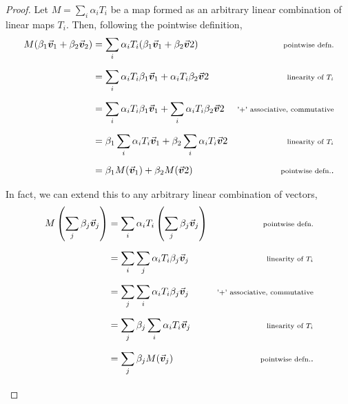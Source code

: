 \documentclass[../MathsNotesBase.tex]{subfiles}
\begin{document}
{		\bigskip
		\begin{proof}
			Let ${ M = \sum_i \alpha_i T_i }$ be a map formed as an arbitrary linear combination of linear maps $T_i$. Then, following the pointwise definition,
			\[\begin{aligned}
				M(\beta_1\v_1 + \beta_2\v_2) &= \sum_i \alpha_i T_i (\beta_1\v_1 + \beta_2\v2) &\sidecomment{pointwise defn.}\nn
				&= \sum_i \alpha_i T_i \beta_1\v_1 + \alpha_i T_i \beta_2\v2 &\sidecomment{linearity of $T_i$}\nn
				&= \sum_i \alpha_i T_i \beta_1\v_1 + \sum_i \alpha_i T_i \beta_2\v2 &\sidecomment{'+' associative, commutative}\nn
				&= \beta_1 \sum_i \alpha_i T_i \v_1 + \beta_2 \sum_i \alpha_i T_i \v2 &\sidecomment{linearity of $T_i$}\nn
				&= \beta_1 M(\v_1) + \beta_2 M(\v2) &\sidecomment{pointwise defn.}.\nn
			\end{aligned}\]
			In fact, we can extend this to any arbitrary linear combination of vectors,
			\[\begin{aligned}
				M\left( \sum_j \beta_j \v_j \right) &= \sum_i \alpha_i T_i \left( \sum_j \beta_j \v_j \right) &\sidecomment{pointwise defn.}\nn
				&= \sum_i \sum_j \alpha_i T_i \beta_j \v_j &\sidecomment{linearity of $T_i$}\nn
				&= \sum_j \sum_i \alpha_i T_i \beta_j \v_j &\sidecomment{'+' associative, commutative}\nn
				&= \sum_j \beta_j \sum_i \alpha_i T_i \v_j &\sidecomment{linearity of $T_i$}\nn
				&= \sum_j \beta_j M(\v_j) &\sidecomment{pointwise defn.}.\nn
			\end{aligned}\]
		\end{proof}
	
	}




\end{document}
